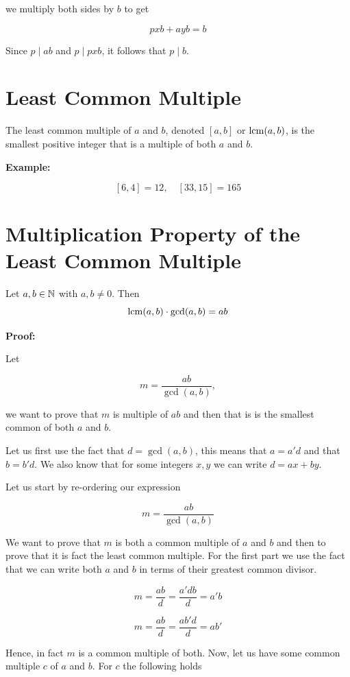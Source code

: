 we multiply both sides by \(b\) to get

\[
	pxb + ayb = b
\]

Since \(p \mid ab\) and \(p \mid pxb\), it follows that \(p \mid b\).

\QED

\section{Least Common Multiple}

The least common multiple of \(a\) and \(b\), denoted \([a, b]\) or \(\mathrm{lcm}(a, b)\), is the smallest positive integer that is
a multiple of both \(a\) and \(b\).

\textbf{Example:}

\[
	[6, 4] = 12, \quad [33, 15] = 165
\]

\section{Multiplication Property of the Least Common Multiple}

Let \(a, b \in \mathbb{N}\) with \(a, b \ne 0\). Then
\[
	\mathrm{lcm}(a, b) \cdot \gcd(a, b) = ab
\]

\textbf{Proof:}

Let

\[
	m = \frac{ab}{\gcd(a, b)},
\]

we want to prove that \(m\) is multiple of \(ab\) and then that is is the smallest common of
both \(a\) and \(b\).

Let us first use the fact that \(d = \gcd(a, b)\), this means that \(a = a'd\) and that \(b = b'd\).
We also know that for some integers \(x, y\) we can write \(d = ax + by\).

Let us start by re-ordering our expression

\[
	m = \frac{ab}{\gcd(a, b)}
\]

We want to prove that \(m\) is both a common multiple of \(a\) and \(b\) and then to prove that it is fact the least common multiple.
For the first part we use the fact that we can write both \(a\) and \(b\) in terms of their greatest common divisor.

\[
	m = \frac{ab}{d} = \frac{a'db}{d} =  a'b
\]

\[
	m = \frac{ab}{d} = \frac{ab'd}{d} =  ab'
\]

Hence, in fact \(m\) is a common multiple of both. Now, let us have some common multiple \(c\) of \(a\) and \(b\).
For \(c\) the following holds

